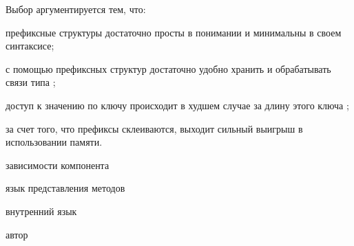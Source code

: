 \begin{SCn}
\begin{scnsubstruct}
\begin{scnsubstruct}
\begin{scnsubstruct}
\begin{scnsubstruct}
{	Выбор аргументируется тем, что:
	\begin{scnitemize}
		\item префиксные структуры достаточно просты в понимании и минимальны в своем синтаксисе;
		\item с помощью префиксных структур достаточно удобно хранить и обрабатывать связи типа ;
		\item доступ к значению по ключу происходит в худшем случае за длину этого ключа \cite{Belazzougui2010};
		\item за счет того, что префиксы склеиваются, выходит сильный выигрыш в использовании памяти.
	\end{scnitemize}}

	\begin{scnrelfromset}{зависимости компонента}
	\end{scnrelfromset}
	\begin{scnrelfromlist}{язык представления методов}
	\end{scnrelfromlist}
	\begin{scnrelfromlist}{внутренний язык}
	\end{scnrelfromlist}
	\begin{scnrelfromlist}{автор}
	\end{scnrelfromlist}
 	

\end{scnsubstruct}
\end{scnsubstruct}
\end{scnsubstruct}
\end{scnsubstruct}
\end{SCn}
